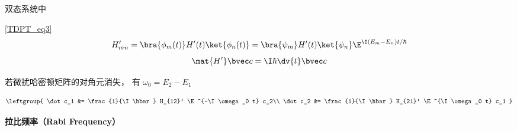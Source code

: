 
双态系统中

\autoref{TDPT_eq3}
\begin{equation}
H'_{mn} = \bra{\phi_m(t)} H'(t) \ket{\phi_n(t)} = \bra{\psi_m} H'(t) \ket{\psi_n} \E^{\I(E_m-E_n)t/\hbar}
\end{equation}
\begin{equation}
\mat {H'} \bvec c = \I\hbar \dv{t} \bvec c
\end{equation}



若微扰哈密顿矩阵的对角元消失， 有 $\omega_0 = E_2 - E_1$


\begin{equation}
\leftgroup{
\dot c_1 &= \frac{1}{\I \hbar} H_{12}' \E^{-\I\omega_0 t} c_2\\
\dot c_2 &= \frac{1}{\I \hbar} H_{21}' \E^{\I\omega_0 t} c_1
}\end{equation}

\textbf{拉比频率（Rabi Frequency）}

